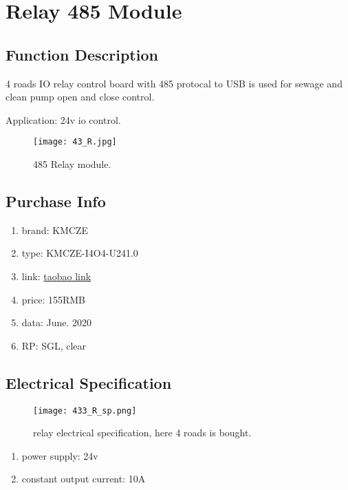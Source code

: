 \setchapterpreamble[u]{\margintoc}
\chapter{ Relay 485 Module}

\section{Function Description}
4 roads IO relay control board with 485 protocal to USB is used for sewage and clean pump open and close control. 


Application: 24v io control.

\begin{figure}[!htb]
	\texttt{[image: 43\_R.jpg]}
	\caption[485 Relay module]{ 
		485 Relay module.		 
		}
\end{figure}
	

\section{Purchase Info}
\begin{enumerate}
	\item brand: KMCZE
	\item type: KMCZE-I4O4-U241.0
	\item link: \href{https://item.taobao.com/item.htm?id=559200622128}{taobao link} 
	\item price: 155RMB
	\item data: June. 2020
	\item RP: SGL, clear
\end{enumerate}


\section{Electrical Specification}

\begin{figure}[!htb]
	\texttt{[image: 433\_R\_sp.png]}
	\caption[ relay electrical specification]{ 
		relay electrical specification, here 4 roads is bought.		 
		}
\end{figure}

\begin{enumerate}
	\item power supply: 24v
	\item constant output current: 10A
\end{enumerate}
